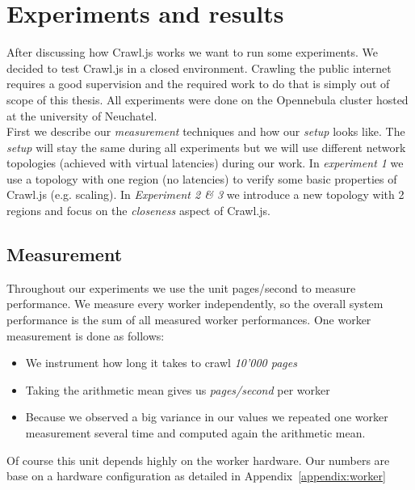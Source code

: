 
\chapter{Experiments and results} %

\label{Chapter5} %


After discussing how Crawl.js works we want to run some experiments. We decided to test Crawl.js in a closed environment. Crawling the public internet requires a good supervision and the required work to do that is simply out of scope of this thesis. All experiments were done on the Opennebula cluster hosted at the university of Neuchatel.
\\
First we describe our \emph{measurement} techniques and how our \emph{setup} looks like. The \emph{setup} will stay the same during all experiments but we will use different network topologies (achieved with virtual latencies) during our work. In \emph{experiment 1} we use a topology with one region (no latencies) to verify some basic properties of Crawl.js (e.g. scaling). In \emph{Experiment 2 \& 3} we introduce a new topology with 2 regions and focus on the \emph{closeness} aspect of Crawl.js.

\section{Measurement}
Throughout our experiments we use the unit pages/second to measure performance. We measure every worker independently, so the overall system performance is the sum of all measured worker performances. One worker measurement is done as follows:
\begin{itemize}
  \item We instrument how long it takes to crawl \emph{10'000 pages}
  \item Taking the arithmetic mean gives us \emph{pages/second} per worker
  \item Because we observed a big variance in our values we repeated one worker measurement several time and computed again the arithmetic mean.
\end{itemize}
Of course this unit depends highly on the worker hardware. Our numbers are base on a hardware configuration as detailed in Appendix~\ref{appendix:worker}

